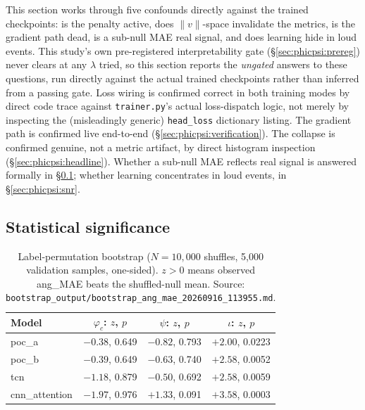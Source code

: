 This section works through five confounds directly against the trained checkpoints: is the penalty active, does $\|v\|$-space invalidate the metrics, is the gradient path dead, is a sub-null MAE real signal, and does learning hide in loud events.
This study's own pre-registered interpretability gate (\S\ref{sec:phicpsi:prereg}) never clears at any $\lambda$ tried, so this section reports the \emph{ungated} answers to these questions, run directly against the actual trained checkpoints rather than inferred from a passing gate.
Loss wiring is confirmed correct in both training modes by direct code trace against \texttt{trainer.py}'s actual loss-dispatch logic, not merely by inspecting the (misleadingly generic) \texttt{head\_loss} dictionary listing.
The gradient path is confirmed live end-to-end (\S\ref{sec:phicpsi:verification}).
The collapse is confirmed genuine, not a metric artifact, by direct histogram inspection (\S\ref{sec:phicpsi:headline}).
Whether a sub-null MAE reflects real signal is answered formally in \S\ref{sec:phicpsi:bootstrap}; whether learning concentrates in loud events, in \S\ref{sec:phicpsi:snr}.

\subsection{Statistical significance}
\label{sec:phicpsi:bootstrap}

\begin{table}[tbp]
    \centering
    \caption{Label-permutation bootstrap ($N=10{,}000$ shuffles, 5{,}000 validation samples, one-sided). $z>0$ means observed ang\_MAE beats the shuffled-null mean. Source: \texttt{bootstrap\_output/bootstrap\_ang\_mae\_20260916\_113955.md}.}
    \label{tab:phicpsi:redo:bootstrap}
    \small
    \begin{tabular}{@{}lccc@{}}
        \toprule
        Model & $\varphi_c$: $z$, $p$ & $\psi$: $z$, $p$ & $\iota$: $z$, $p$ \\
        \midrule
        poc\_a & $-0.38$, 0.649 & $-0.82$, 0.793 & $+2.00$, 0.0223 \\
        poc\_b & $-0.39$, 0.649 & $-0.63$, 0.740 & $+2.58$, 0.0052 \\
        tcn & $-1.18$, 0.879 & $-0.50$, 0.692 & $+2.58$, 0.0059 \\
        cnn\_attention & $-1.97$, 0.976 & $+1.33$, 0.091 & $+3.58$, 0.0003 \\
        \bottomrule
    \end{tabular}
\end{table}

